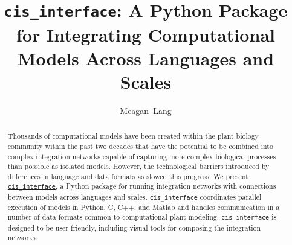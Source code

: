 \documentclass[journal]{IEEEtran}
\newcommand{\cis}{{\tt cis\_interface}{}}
\begin{document}
\shorttitle{{\cis}}

\title{{\cis}: A Python Package for Integrating Computational Models Across Languages and Scales}

\author{Meagan~Lang}



\begin{abstract}
Thousands of computational models have been created within the plant biology community within the past two decades that have the potential to be combined into complex integration networks capable of capturing more complex biological processes than possible as isolated models. However, the technological barriers introduced by differences in language and data formats as slowed this progress. We present \href{https://github.com/cropsinsilico/cis_interface}{\cis}, a Python package for running integration networks with connections between models across languages and scales. {\cis} coordinates parallel execution of models in Python, C, C++, and Matlab and handles communication in a number of data formats common to computational plant modeling. {\cis} is designed to be user-friendly, including visual tools for composing the integration networks. 
\end{abstract}




\maketitle
\end{document}
